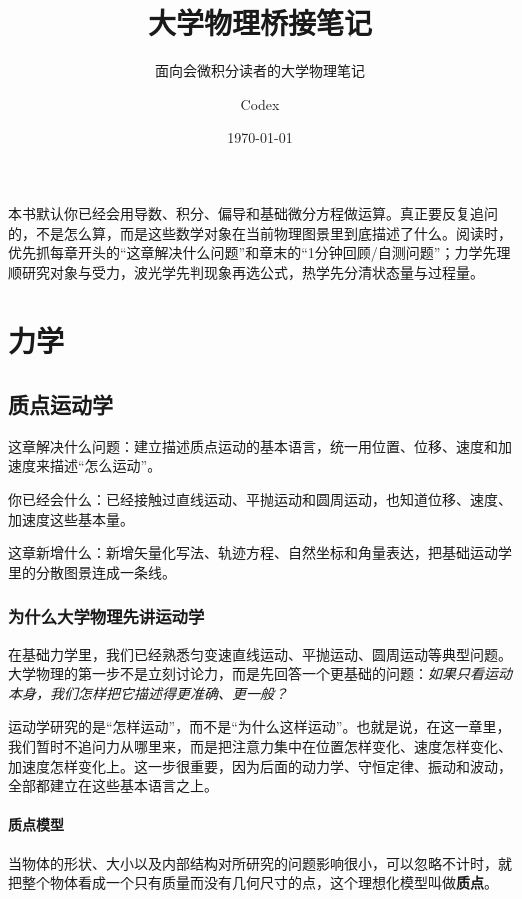 \documentclass[lang=cn,11pt]{elegantbook}
\title{大学物理桥接笔记}
\subtitle{面向会微积分读者的大学物理笔记}
\author{Codex}
\institute{ElegantBook 重构实践}
\date{\today}
\newcommand{\bridge}[1]{\begin{note}#1\end{note}}
\newcommand{\chapterroadmap}[3]{%
\begin{introduction}
  \item {\heiti 这章解决什么问题：}#1
  \item {\heiti 你已经会什么：}#2
  \item {\heiti 这章新增什么：}#3
\end{introduction}}
\begin{document}
\maketitle
\frontmatter

\tableofcontents
\makeenvindex

\mainmatter

\bridge{本书默认你已经会用导数、积分、偏导和基础微分方程做运算。真正要反复追问的，不是怎么算，而是这些数学对象在当前物理图景里到底描述了什么。阅读时，优先抓每章开头的“这章解决什么问题”和章末的“1分钟回顾/自测问题”；力学先理顺研究对象与受力，波光学先判现象再选公式，热学先分清状态量与过程量。}

\part{力学}

\chapter{质点运动学}

\chapterroadmap
{建立描述质点运动的基本语言，统一用位置、位移、速度和加速度来描述“怎么运动”。}
{已经接触过直线运动、平抛运动和圆周运动，也知道位移、速度、加速度这些基本量。}
{新增矢量化写法、轨迹方程、自然坐标和角量表达，把基础运动学里的分散图景连成一条线。}

\section{为什么大学物理先讲运动学}

在基础力学里，我们已经熟悉匀变速直线运动、平抛运动、圆周运动等典型问题。大学物理的第一步不是立刻讨论力，而是先回答一个更基础的问题：\emph{如果只看运动本身，我们怎样把它描述得更准确、更一般？}

运动学研究的是“怎样运动”，而不是“为什么这样运动”。也就是说，在这一章里，我们暂时不追问力从哪里来，而是把注意力集中在位置怎样变化、速度怎样变化、加速度怎样变化上。这一步很重要，因为后面的动力学、守恒定律、振动和波动，全部都建立在这些基本语言之上。

\subsection{质点模型}

\begin{definition}[质点]\label{def:particle}
当物体的形状、大小以及内部结构对所研究的问题影响很小，可以忽略不计时，就把整个物体看成一个只有质量而没有几何尺寸的点，这个理想化模型叫做\textbf{质点}。
\end{definition}
\end{document}
